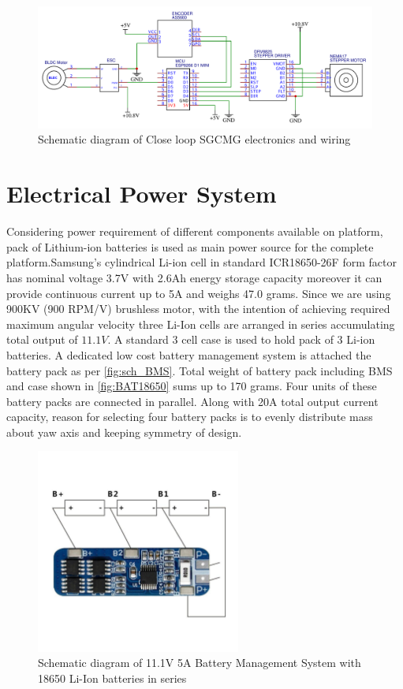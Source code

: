 \begin{figure}[ht]
    \centering
    \includegraphics[width=\textwidth]{figures/Assembly/sgcmg_wiring.pdf}
    \caption{Schematic diagram of Close loop SGCMG electronics and wiring}
    \label{fig:sch_sgcmg_wiring}
\end{figure}

\section{Electrical Power System}
Considering power requirement of different components available on platform, pack of Lithium-ion batteries is used as main power source for the complete platform.Samsung's cylindrical Li-ion cell in standard  ICR18650-26F form factor has nominal voltage 3.7V with 2.6Ah energy storage capacity moreover it can provide continuous current up to 5A and weighs 47.0 grams. Since we are using 900KV (900 RPM/V) brushless motor, with the intention of achieving required maximum angular velocity three Li-Ion cells are arranged in series accumulating total output of $11.1V$. A standard 3 cell case is used to hold pack of 3 Li-ion batteries. A dedicated low cost battery management system is attached the battery pack as per \autoref{fig:sch_BMS}. Total weight of battery pack including BMS and case shown in \autoref{fig:BAT18650} sums up to 170 grams. Four units of these battery packs are connected in parallel. Along with 20A total output current capacity, reason for selecting four battery packs is to evenly distribute mass about yaw axis and keeping symmetry of design. 
\begin{figure}[ht]
    \centering
    \includegraphics[width=0.6\textwidth]{figures/Assembly/BMS.pdf}
    \caption{Schematic diagram of 11.1V 5A Battery Management System with 18650 Li-Ion batteries in series}
    \label{fig:sch_BMS}
\end{figure}

